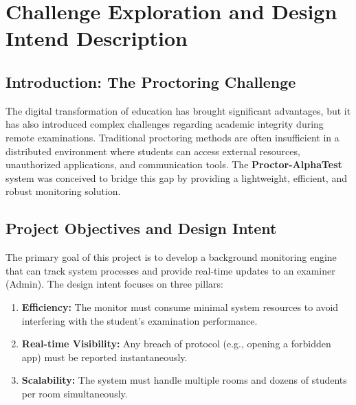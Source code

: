 \documentclass[12pt,a4paper]{article}
\begin{document}
\newpage
\section{Challenge Exploration and Design Intend Description}

\subsection{Introduction: The Proctoring Challenge}
The digital transformation of education has brought significant advantages, but it has also introduced complex challenges regarding academic integrity during remote examinations. Traditional proctoring methods are often insufficient in a distributed environment where students can access external resources, unauthorized applications, and communication tools. The \textbf{Proctor-AlphaTest} system was conceived to bridge this gap by providing a lightweight, efficient, and robust monitoring solution.

\subsection{Project Objectives and Design Intent}
The primary goal of this project is to develop a background monitoring engine that can track system processes and provide real-time updates to an examiner (Admin). The design intent focuses on three pillars:
\begin{enumerate}
    \item \textbf{Efficiency:} The monitor must consume minimal system resources to avoid interfering with the student's examination performance.
    \item \textbf{Real-time Visibility:} Any breach of protocol (e.g., opening a forbidden app) must be reported instantaneously.
    \item \textbf{Scalability:} The system must handle multiple rooms and dozens of students per room simultaneously.
\end{enumerate}
\end{document}
